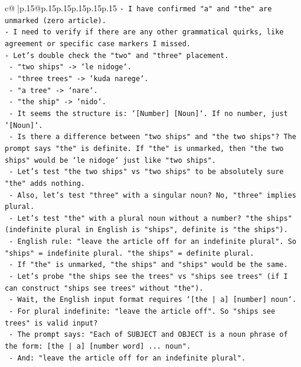 \documentclass{article}
\begin{document}
{\begin{supertabular}{c@{$\;$}|p{.15\linewidth}@{}p{.15\linewidth}p{.15\linewidth}p{.15\linewidth}p{.15\linewidth}p{.15\linewidth}}
{{{\texttt{{-} I have confirmed "a" and "the" are unmarked (zero article).} \\
\texttt{{-} I need to verify if there are any other grammatical quirks, like agreement or specific case markers I missed.} \\
\texttt{{-} Let's double check the "two" and "three" placement.} \\
\texttt{  {-} "two ships" {-}> `le nidoge`.} \\
\texttt{  {-} "three trees" {-}> `kuda narege`.} \\
\texttt{  {-} "a tree" {-}> `nare`.} \\
\texttt{  {-} "the ship" {-}> `nido`.} \\
\texttt{  {-} It seems the structure is: `{[}Number{]} {[}Noun{]}`. If no number, just `{[}Noun{]}`.} \\
\texttt{  {-} Is there a difference between "two ships" and "the two ships"? The prompt says "the" is definite. If "the" is unmarked, then "the two ships" would be `le nidoge` just like "two ships".} \\
\texttt{  {-} Let's test "the two ships" vs "two ships" to be absolutely sure "the" adds nothing.} \\
\texttt{  {-} Also, let's test "three" with a singular noun? No, "three" implies plural.} \\
\texttt{  {-} Let's test "the" with a plural noun without a number? "the ships" (indefinite plural in English is "ships", definite is "the ships").} \\
\texttt{  {-} English rule: "leave the article off for an indefinite plural". So "ships" = indefinite plural. "the ships" = definite plural.} \\
\texttt{  {-} If "the" is unmarked, "the ships" and "ships" would be the same.} \\
\texttt{  {-} Let's probe "the ships see the trees" vs "ships see trees" (if I can construct "ships see trees" without "the").} \\
\texttt{  {-} Wait, the English input format requires `{[}the | a{]} {[}number{]} noun`.} \\
\texttt{  {-} For plural indefinite: "leave the article off". So "ships see trees" is valid input?} \\
\texttt{  {-} The prompt says: "Each of SUBJECT and OBJECT is a noun phrase of the form: {[}the | a{]} {[}number word{]} ... noun".} \\
\texttt{  {-} And: "leave the article off for an indefinite plural".} \\
}}}
\end{supertabular}}
\end{document}
